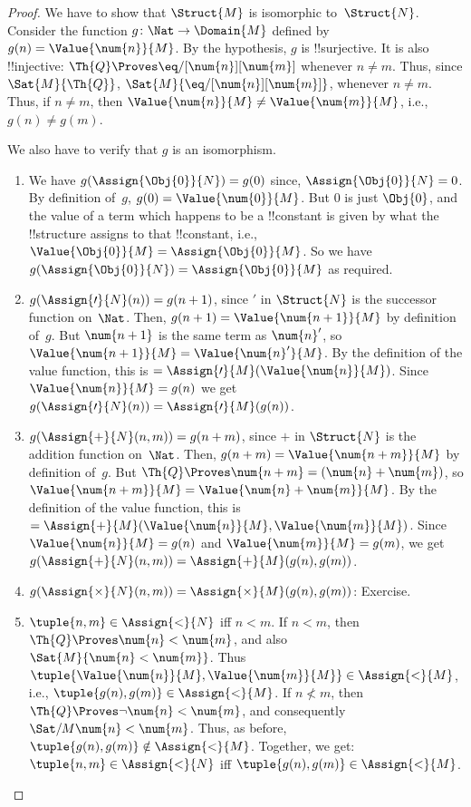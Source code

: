 \documentclass[../../../include/open-logic-section]{subfiles}
\begin{document}
\begin{proof}
We have to show that $\Struct{M}$ is isomorphic
to~$\Struct{N}$. Consider the function $g\colon \Nat \to \Domain{M}$
defined by $g(n) = \Value{\num{n}}{M}$. By the hypothesis, $g$ is
!!{surjective}.  It is also !!{injective}: $\Th{Q} \Proves
\eq/[\num{n}][\num{m}]$ whenever $n \neq m$. Thus, since
$\Sat{M}{\Th{Q}}$, $\Sat{M}{\eq/[\num{n}][\num{m}]}$, whenever $n \neq
m$. Thus, if $n \neq m$, then $\Value{\num{n}}{M} \neq
\Value{\num{m}}{M}$, i.e., $g(n) \neq g(m)$.

We also have to verify that $g$ is an isomorphism.
\begin{enumerate}
\item We have $g(\Assign{\Obj{0}}{N}) = g(0)$ since,
  $\Assign{\Obj{0}}{N} = 0$. By definition of~$g$, $g(0) =
  \Value{\num{0}}{M}$. But $\num{0}$ is just $\Obj{0}$, and the value
  of a term which happens to be a !!{constant} is given by what the
  !!{structure} assigns to that !!{constant}, i.e.,
  $\Value{\Obj{0}}{M} = \Assign{\Obj{0}}{M}$. So we have
  $g(\Assign{\Obj{0}}{N}) = \Assign{\Obj{0}}{M}$ as required.
\item $g(\Assign{\prime}{N}(n)) = g(n+1)$, since $\prime$ in
  $\Struct{N}$ is the successor function on~$\Nat$. Then, $g(n+1) =
  \Value{\num{n+1}}{M}$ by definition of~$g$. But $\num{n+1}$ is the
  same term as $\num{n}'$, so $\Value{\num{n+1}}{M} =
  \Value{\num{n}'}{M}$. By the definition of the value function, this
  is $= \Assign{\prime}{M}(\Value{\num{n}}{M})$. Since
    $\Value{\num{n}}{M} = g(n)$ we get $g(\Assign{\prime}{N}(n)) =
  \Assign{\prime}{M}(g(n))$.
\item $g(\Assign{+}{N}(n,m)) = g(n+m)$, since $+$ in $\Struct{N}$ is
  the addition function on~$\Nat$. Then, $g(n+m) =
  \Value{\num{n+m}}{M}$ by definition of~$g$. But $\Th{Q} \Proves
  \num{n+m} = (\num{n} + \num{m})$, so $\Value{\num{n+m}}{M} =
  \Value{\num{n}+\num{m}}{M}$. By the definition of the value
  function, this is $=
  \Assign{+}{M}(\Value{\num{n}}{M},\Value{\num{m}}{M})$. Since
    $\Value{\num{n}}{M} = g(n)$ and $\Value{\num{m}}{M} = g(m)$, we
    get $g(\Assign{+}{N}(n, m)) = \Assign{+}{M}(g(n), g(m))$.
\item $g(\Assign{\times}{N}(n, m)) = \Assign{\times}{M}(g(n), g(m))$:
  Exercise.
\item $\tuple{n,m} \in \Assign{<}{N}$ iff $n < m$. If $n < m$, then
  $\Th{Q} \Proves \num{n} < \num{m}$, and also $\Sat{M}{\num{n} <
  \num{m}}$. Thus $\tuple{\Value{\num{n}}{M}, \Value{\num{m}}{M}} \in
  \Assign{<}{M}$, i.e., $\tuple{g(n), g(m)} \in \Assign{<}{M}$. If $n
  \not< m$, then $\Th{Q} \Proves \lnot \num{n} < \num{m}$, and
  consequently $\Sat/{M}{\num{n} < \num{m}}$. Thus, as before,
  $\tuple{g(n), g(m)} \notin \Assign{<}{M}$. Together, we get:
  $\tuple{n,m} \in \Assign{<}{N}$ iff $\tuple{g(n), g(m)} \in
  \Assign{<}{M}$.
\end{enumerate}
\end{proof}
\end{document}
